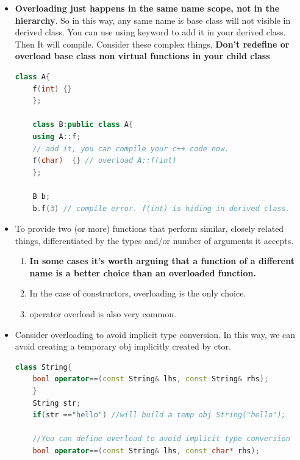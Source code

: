 \documentclass[a4paper,11pt,twoside]{book}
\begin{document}
\begin{itemize}
	
	\item  \textbf{Overloading just happens in the same name scope, not in the hierarchy}. So in this way, any same name is base class will not  visible in derived class. You can use using keyword to add it in your derived class. Then It will compile. Consider these complex things, \textbf{Don't redefine or overload base class non virtual functions in your child class}
	
	\begin{lstlisting}[frame=single, language=c++]
	class A{
	f(int) {}
	};
	
	class B:public class A{
	using A::f;
	// add it, you can compile your c++ code now.
	f(char)  {} // overload A::f(int)
	};
	
	B b;
	b.f(3) // compile error. f(int) is hiding in derived class.
	\end{lstlisting}
	
	\item To provide two (or more) functions that perform similar, closely related things, differentiated by the types and/or number of arguments it accepts.
	
	\begin{enumerate}
		\item \textbf{In some cases it's worth arguing that a function of a different name is a better choice than an overloaded function.}
		
		\item  In the case of constructors, overloading is the only choice.
		
		\item  operator overload is also very common.
	\end{enumerate}
	
	\item Consider overloading to avoid implicit type conversion. In this way, we can avoid creating a temporary obj implicitly created by ctor.
	
	\begin{lstlisting}[frame=single, language=c++]
	class String{
	bool operator==(const String& lhs, const String& rhs);
	}
	String str;
	if(str =="hello") //will build a temp obj String("hello");
	
	//You can define overload to avoid implicit type conversion
	bool operator==(const String& lhs, const char* rhs);
	\end{lstlisting}
	

\end{itemize}
\end{document}
